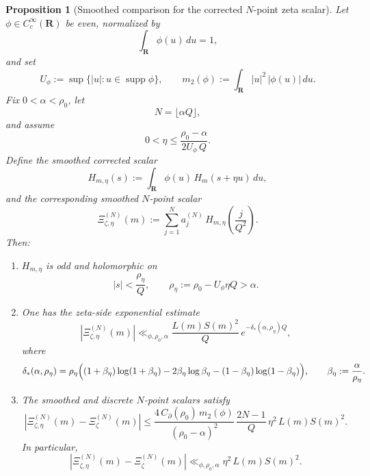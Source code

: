 \documentclass[11pt,a4paper]{amsart}
\theoremstyle{plain}
\newtheorem{proposition}[theorem]{Proposition}
\theoremstyle{definition}
\begin{document}
\begin{proposition}[Smoothed comparison for the corrected $N$-point zeta scalar]
\label{prop:smoothed-zeta-n-point-comparison}
Let $\phi\in C_c^\infty(\mathbf R)$ be even, normalized by
\[
\int_{\mathbf R}\phi(u)\,du=1,
\]
and set
\[
U_\phi:=\sup\{|u|:u\in \operatorname{supp}\phi\},
\qquad
m_2(\phi):=\int_{\mathbf R}|u|^2\,|\phi(u)|\,du.
\]
Fix $0<\alpha<\rho_0$, let
\[
N=\lfloor \alpha Q\rfloor,
\]
and assume
\[
0<\eta\le \frac{\rho_0-\alpha}{2U_\phi\,Q}.
\]
Define the smoothed corrected scalar
\[
H_{m,\eta}(s):=\int_{\mathbf R}\phi(u)\,H_m(s+\eta u)\,du,
\]
and the corresponding smoothed $N$-point scalar
\[
\Xi_{\zeta,\eta}^{(N)}(m)
:=
\sum_{j=1}^N a_j^{(N)}\,H_{m,\eta}\!\left(\frac{j}{Q^2}\right).
\]
Then:

\begin{enumerate}
\item $H_{m,\eta}$ is odd and holomorphic on
\[
|s|<\frac{\rho_\eta}{Q},
\qquad
\rho_\eta:=\rho_0-U_\phi \eta Q>\alpha.
\]

\item One has the zeta-side exponential estimate
\[
|\Xi_{\zeta,\eta}^{(N)}(m)|
\ll_{\phi,\rho_0,\alpha}
\frac{L(m)S(m)^2}{Q}\,
e^{-\delta_*(\alpha,\rho_\eta)Q},
\]
where
\[
\delta_*(\alpha,\rho_\eta)
=
\rho_\eta\Bigl(
(1+\beta_\eta)\log(1+\beta_\eta)
-2\beta_\eta\log\beta_\eta
-(1-\beta_\eta)\log(1-\beta_\eta)
\Bigr),
\qquad
\beta_\eta:=\frac{\alpha}{\rho_\eta}.
\]

\item The smoothed and discrete $N$-point scalars satisfy
\[
|\Xi_{\zeta,\eta}^{(N)}(m)-\Xi_{\zeta}^{(N)}(m)|
\le
\frac{4\,C_{\partial}(\rho_0)\,m_2(\phi)}{(\rho_0-\alpha)^2}\,
\frac{2N-1}{Q}\,
\eta^2\,L(m)S(m)^2.
\]
In particular,
\[
|\Xi_{\zeta,\eta}^{(N)}(m)-\Xi_{\zeta}^{(N)}(m)|
\ll_{\phi,\rho_0,\alpha}
\eta^2\,L(m)S(m)^2.
\]
\end{enumerate}
\end{proposition}
\end{document}
